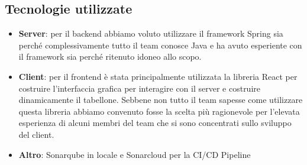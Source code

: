\documentclass{article}
\begin{document}
\subsection{Tecnologie utilizzate}
\begin{itemize}
	\item \textbf{Server}: per il backend abbiamo voluto utilizzare il framework Spring sia perché complessivamente tutto il team conosce Java e ha avuto esperiente con il framework sia perché ritenuto idoneo allo scopo.


	\item \textbf{Client}: per il frontend è stata principalmente utilizzata la libreria React per costruire l'interfaccia grafica per interagire con il server e costruire dinamicamente il tabellone.
	Sebbene non tutto il team sapesse come utilizzare questa libreria abbiamo convenuto fosse la scelta più ragionevole per l'elevata esperienza di alcuni membri del team che si sono concentrati sullo sviluppo del client.
	
	\item \textbf{Altro}: Sonarqube in locale e Sonarcloud per la CI/CD Pipeline
\end{itemize}
\end{document}
